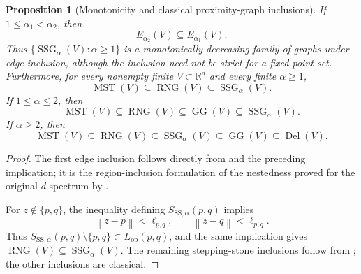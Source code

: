 \documentclass[a4paper,fleqn]{cas-sc}
\newtheorem{proposition}{Proposition}
\theoremstyle{definition}
\theoremstyle{remark}
\newcommand{\R}{\mathds{R}}
\newcommand{\norm}[1]{\left\lVert #1\right\rVert}
\newcommand{\ellpq}{\ell_{p,q}}
\newcommand{\0}{\mathbf{0}}
\newcommand{\tr}[1]{#1}
\newcommand{\tg}[1]{#1}
\newcommand{\tb}[1]{#1}
\newcommand{\tv}[1]{#1}
\newcommand{\ttq}[1]{#1}
\newcommand{\tor}[1]{#1}
\newcommand{\tfg}[1]{#1}
\newcommand{\tfr}[1]{#1}
\newcommand{\tfb}[1]{#1}
\newcommand{\tr}[1]{\textcolor[HTML]{aa0000}{#1}}
\newcommand{\tg}[1]{\textcolor[HTML]{007700}{#1}}
\newcommand{\tb}[1]{\textcolor[HTML]{0000bb}{#1}}
\newcommand{\tv}[1]{\textcolor[HTML]{6A1B9A}{#1}}
\newcommand{\ttq}[1]{\textcolor[HTML]{008B8B}{#1}}
\newcommand{\tor}[1]{\textcolor[HTML]{C75B00}{#1}}
\newcommand{\tfg}[1]{\textcolor[HTML]{00FF00}{#1}}
\newcommand{\tfr}[1]{\textcolor[HTML]{FF0000}{#1}}
\newcommand{\tfb}[1]{\textcolor[HTML]{666666}{#1}}
\DeclareMathOperator{\SSG}{SSG}
\DeclareMathOperator{\RNG}{RNG}
\DeclareMathOperator{\GG}{GG}
\DeclareMathOperator{\Del}{Del}
\DeclareMathOperator{\MST}{MST}
\begin{document}
\begin{proposition}[Monotonicity and classical proximity-graph inclusions]
\label{prop:inclusions}
If $1\leq\alpha_1<\alpha_2$, then
\begin{equation}\label{eq:ss-edge-monotonicity}
    E_{\alpha_2}(V)\subseteq E_{\alpha_1}(V).
\end{equation}
Thus $\{\SSG_\alpha(V):\alpha\geq1\}$ is a monotonically decreasing family
of graphs under edge inclusion, although the inclusion need not be strict for
a fixed point set.
Furthermore, for every \ttq{nonempty} finite $V\subset\R^d$ and every finite
$\alpha\geq1$,
\begin{equation}
    \MST(V)\subseteq\RNG(V)\subseteq\SSG_\alpha(V).
\end{equation}
If $1\leq\alpha\leq2$, then
\begin{equation}
    \MST(V)\subseteq\RNG(V)\subseteq\GG(V)
    \subseteq\SSG_\alpha(V).
\end{equation}
If $\alpha\geq2$, then
\begin{equation}\label{eq:tail-chain}
    \MST(V)\subseteq\RNG(V)\subseteq\SSG_\alpha(V)
    \subseteq\GG(V)\subseteq\Del(V).
\end{equation}
\end{proposition}

\begin{proof}
The first edge inclusion follows directly from  and
the preceding implication; it is the region-inclusion formulation of the
nestedness proved for the original $d$-spectrum by
\citet{kannangara2018stepping,kannangara2019stepping}.

For $z\notin\{p,q\}$, the inequality defining
$S_{\mathrm{SS},\alpha}(p,q)$ implies
\begin{equation}
    \norm{z-p}<\ellpq,
    \qquad
    \norm{z-q}<\ellpq.
\end{equation}
Thus
$S_{\mathrm{SS},\alpha}(p,q)\setminus\{p,q\}
\subset L_{\mathrm{op}}(p,q)$,
and the same implication gives $\RNG(V)\subseteq\SSG_\alpha(V)$. The remaining
stepping-stone inclusions follow from
; the other inclusions are
classical.
\end{proof}

\clearpage
\begingroup

\renewcommand{\tr}[1]{#1}
\renewcommand{\tg}[1]{#1}
\renewcommand{\tb}[1]{#1}
\renewcommand{\tv}[1]{#1}
\renewcommand{\tor}[1]{#1}
\renewcommand{\ttq}[1]{#1}
\renewcommand{\tfg}[1]{#1}
\renewcommand{\tfr}[1]{#1}
\renewcommand{\tfb}[1]{#1}
\end{document}
